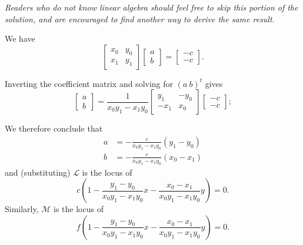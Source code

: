 \documentclass[a4paper,10pt]{article}
\begin{document}
\begin{mdframed}[hidealllines=true,backgroundcolor=Dandelion!20]
\textit{Readers who do not know linear algebra should feel free to skip this portion of the solution, and are encouraged to find
another way to derive the same result.}

We have
\begin{displaymath}
  \begin{bmatrix} x_0 & y_0 \\ x_1 & y_1 \end{bmatrix} \begin{bmatrix} a\\b \end{bmatrix} = \begin{bmatrix} -c\\-c \end{bmatrix}.
\end{displaymath}

Inverting the coefficient matrix and solving for $ (a\ b)^t $ gives
\begin{displaymath}
  \begin{bmatrix} a\\b \end{bmatrix} = \frac{1}{x_0 y_1 - x_1 y_0} \begin{bmatrix} y_1 & -y_0 \\ -x_1 & x_0 \end{bmatrix} \begin{bmatrix} -c\\-c \end{bmatrix};
\end{displaymath}
\end{mdframed}

We therefore conclude that
\begin{align*}
  a &= -\frac{c}{x_0 y_1 - x_1 y_0} (y_1 - y_0)\\
  b &= -\frac{c}{x_0 y_1 - x_1 y_0} (x_0 - x_1)
\end{align*}
and (substituting) $ \mathcal{L} $ is the locus of
\begin{displaymath}
  c \left(1 - \frac{y_1 - y_0}{x_0 y_1 - x_1 y_0} x - \frac{x_0 - x_1}{x_0 y_1 - x_1 y_0} y \right) = 0.
\end{displaymath}
Similarly, $ \mathcal{M} $ is the locus of
\begin{displaymath}
  f \left(1 - \frac{y_1 - y_0}{x_0 y_1 - x_1 y_0} x - \frac{x_0 - x_1}{x_0 y_1 - x_1 y_0} y \right) = 0.
\end{displaymath}
\end{document}
